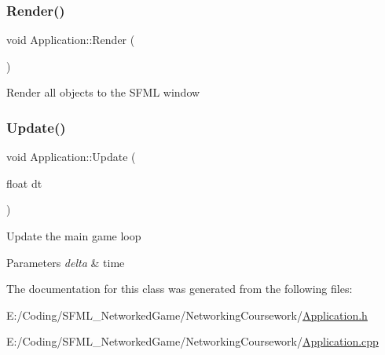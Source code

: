 \subsubsection{\texorpdfstring{Render()}{Render()}}
{\footnotesize\ttfamily void Application\+::\+Render (\begin{DoxyParamCaption}{ }\end{DoxyParamCaption})}

Render all objects to the S\+F\+ML window \hypertarget{class_application_a28c5c9dba1b7a8ca51b54b6e624c22b6}{}\label{class_application_a28c5c9dba1b7a8ca51b54b6e624c22b6} 
\subsubsection{\texorpdfstring{Update()}{Update()}}
{\footnotesize\ttfamily void Application\+::\+Update (\begin{DoxyParamCaption}\item[{float}]{dt }\end{DoxyParamCaption})}

Update the main game loop


\begin{DoxyParams}{Parameters}
{\em delta} & time \\
\hline
\end{DoxyParams}


The documentation for this class was generated from the following files\+:\begin{DoxyCompactItemize}
\item 
E\+:/\+Coding/\+S\+F\+M\+L\+\_\+\+Networked\+Game/\+Networking\+Coursework/\hyperlink{_application_8h}{Application.\+h}\item 
E\+:/\+Coding/\+S\+F\+M\+L\+\_\+\+Networked\+Game/\+Networking\+Coursework/\hyperlink{_application_8cpp}{Application.\+cpp}\end{DoxyCompactItemize}
